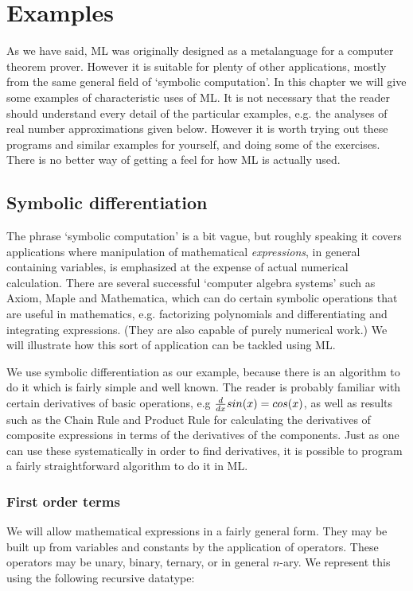 \chapter{Examples}

As we have said, ML was originally designed as a metalanguage for a computer
theorem prover. However it is suitable for plenty of other applications, mostly
from the same general field of `symbolic computation'. In this chapter we will
give some examples of characteristic uses of ML. It is not necessary that the
reader should understand every detail of the particular examples, e.g. the
analyses of real number approximations given below. However it is worth trying
out these programs and similar examples for yourself, and doing some of the
exercises. There is no better way of getting a feel for how ML is actually
used.

\section{Symbolic differentiation}

The phrase `symbolic computation' is a bit vague, but roughly speaking it
covers applications where manipulation of mathematical {\em expressions}, in
general containing variables, is emphasized at the expense of actual numerical
calculation. There are several successful `computer algebra systems' such as
Axiom, Maple and Mathematica, which can do certain symbolic operations that are
useful in mathematics, e.g. factorizing polynomials and differentiating and
integrating expressions. (They are also capable of purely numerical work.) We
will illustrate how this sort of application can be tackled using ML.

We use symbolic differentiation as our example, because there is an algorithm
to do it which is fairly simple and well known. The reader is probably familiar
with certain derivatives of basic operations, e.g ${d \over dx} sin(x) =
cos(x)$, as well as results such as the Chain Rule and Product Rule for
calculating the derivatives of composite expressions in terms of the
derivatives of the components. Just as one can use these systematically in
order to find derivatives, it is possible to program a fairly straightforward
algorithm to do it in ML.

\subsection{First order terms}

We will allow mathematical expressions in a fairly general form. They may be
built up from variables and constants by the application of operators. These
operators may be unary, binary, ternary, or in general $n$-ary. We represent
this using the following recursive datatype:

